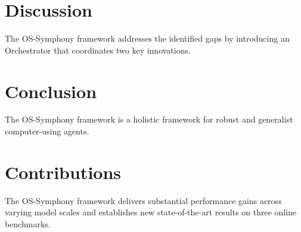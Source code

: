 \documentclass{article}
\begin{document}
\section{Discussion}
The OS-Symphony framework addresses the identified gaps by introducing an Orchestrator that coordinates two key innovations.

\section{Conclusion}
The OS-Symphony framework is a holistic framework for robust and generalist computer-using agents.

\section{Contributions}
The OS-Symphony framework delivers substantial performance gains across varying model scales and establishes new state-of-the-art results on three online benchmarks.
\end{document}

